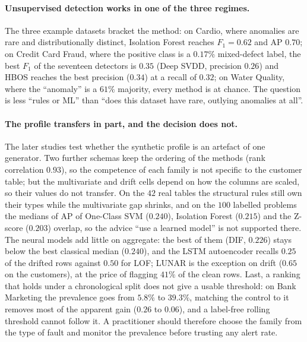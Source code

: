 \documentclass[conference]{IEEEtran}
\begin{document}
\paragraph{Unsupervised detection works in one of the three regimes.}
The three example datasets bracket the method: on Cardio, where anomalies
are rare and distributionally distinct, Isolation Forest reaches
$F_1 = 0.62$ and AP $0.70$; on Credit Card Fraud, where the positive
class is a $0.17\%$ mixed-defect label, the best $F_1$ of the seventeen
detectors is $0.35$ (Deep SVDD, precision $0.26$) and HBOS reaches the best precision
($0.34$) at a recall of $0.32$; on Water Quality, where the ``anomaly''
is a $61\%$ majority, every method is at chance. The question is less
``rules or ML'' than ``does this dataset have rare, outlying anomalies at
all''.

\paragraph{The profile transfers in part, and the decision does not.}
The later studies test whether the synthetic profile is an artefact of one
generator. Two further schemas keep the ordering of the methods (rank
correlation $0.93$), so the competence of each family is not specific to the
customer table; but the multivariate and drift cells depend on how the columns
are scaled, so their values do not transfer. On the $42$ real tables the
structural rules still own their types while the multivariate gap shrinks, and
on the $100$ labelled problems the medians of AP of One-Class SVM ($0.240$),
Isolation Forest ($0.215$) and the Z-score ($0.203$) overlap, so the advice
``use a learned model'' is not supported there. The neural models add little on
aggregate: the best of them (DIF, $0.226$) stays below the best classical median
($0.240$), and the LSTM autoencoder recalls $0.25$ of the drifted rows against
$0.50$ for LOF; LUNAR is the exception on drift ($0.65$ on the customers), at the price of
flagging $41\%$ of the clean rows.
Last, a ranking that holds under a chronological split does not give a usable
threshold: on Bank Marketing the prevalence goes from $5.8\%$ to $39.3\%$,
matching the control to it removes most of the apparent gain ($0.26$ to $0.06$),
and a label-free rolling threshold cannot follow it. A practitioner should
therefore choose the family from the type of fault and monitor the prevalence
before trusting any alert rate.
\end{document}
